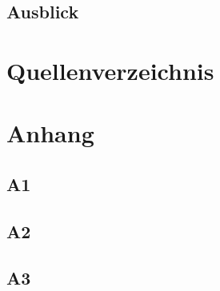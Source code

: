 \documentclass[ngerman,11pt,a4paper,titlepage]{article}
\begin{document}
		\subsection{Ausblick}
		\label{subsec:ausblick}
		\ausblickText
	
	\section{Quellenverzeichnis}
	\label{sec
	}
	\quellenverzeichnisText
	
	\section{Anhang}
	\label{sec
	}
	\anhangText
	\subsection{A1}
	\label{subsec:a1}
	\anhangEins
	
	\subsection{A2}
	\label{subsec:a2}
	\anhangZwei
	
	\subsection{A3}
	\label{subsec:a3}
	\anhangDrei
	\pagebreak
	
\end{document}
